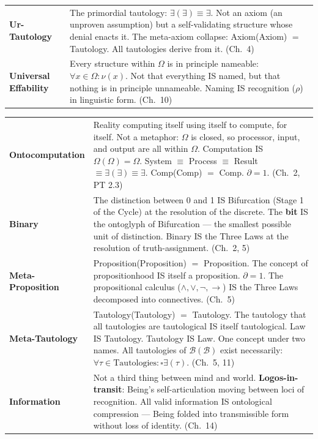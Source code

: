 \documentclass[10pt, openany, oneside]{book}
\renewcommand{\footnotesize}{\fontsize{8.5}{11}\selectfont}
\begin{document}
{\begin{tabular}{@{} l @{\hspace{0.6em}} p{} @{}}
\textbf{Ur-Tautology} & The primordial tautology: $\exists(\exists) \equiv \exists$. Not an axiom (an unproven assumption) but a self-validating structure whose denial enacts it. The meta-axiom collapse: Axiom(Axiom) $=$ Tautology. All tautologies derive from it. (Ch.\ 4) \\[0.3em]
\textbf{Universal Effability} & Every structure within $\Omega$ is in principle nameable: $\forall x \in \Omega: \nu(x)$. Not that everything IS named, but that nothing is in principle unnameable. Naming IS recognition ($\rho$) in linguistic form. (Ch.\ 10) \\[0.3em]
\end{tabular}
}

\newpage

{\footnotesize
\noindent\begin{tabular}{@{} l @{\hspace{0.6em}} p{} @{}}
\textbf{Ontocomputation} & Reality computing itself using itself to compute, for itself. Not a metaphor: $\Omega$ is closed, so processor, input, and output are all within $\Omega$. Computation IS $\Omega(\Omega) = \Omega$. System $\equiv$ Process $\equiv$ Result $\equiv \exists(\exists) \equiv \exists$. Comp(Comp) $=$ Comp. $\partial = 1$. (Ch.\ 2, PT 2.3) \\[0.3em]
\textbf{Binary} & The distinction between 0 and 1 IS Bifurcation (Stage 1 of the Cycle) at the resolution of the discrete. The \textbf{bit} IS the ontoglyph of Bifurcation --- the smallest possible unit of distinction. Binary IS the Three Laws at the resolution of truth-assignment. (Ch.\ 2, 5) \\[0.3em]
\textbf{Meta-Proposition} & Proposition(Proposition) $=$ Proposition. The concept of propositionhood IS itself a proposition. $\partial = 1$. The propositional calculus ($\wedge, \vee, \neg, \to$) IS the Three Laws decomposed into connectives. (Ch.\ 5) \\[0.3em]
\textbf{Meta-Tautology} & Tautology(Tautology) $=$ Tautology. The tautology that all tautologies are tautological IS itself tautological. Law IS Tautology. Tautology IS Law. One concept under two names. All tautologies of $\mathcal{B}(\mathcal{B})$ exist necessarily: $\forall \tau \in \text{Tautologies}: \square\exists(\tau)$. (Ch.\ 5, 11) \\[0.3em]
\textbf{Information} & Not a third thing between mind and world. \textbf{Logos-in-transit}: Being's self-articulation moving between loci of recognition. All valid information IS ontological compression --- Being folded into transmissible form without loss of identity. (Ch.\ 14) \\[0.3em]

\end{tabular}}
\end{document}
